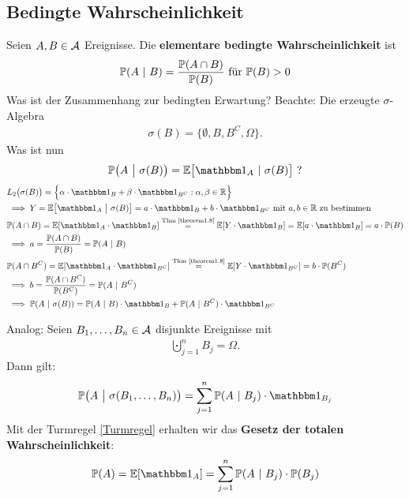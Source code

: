 \subsection*{Bedingte Wahrscheinlichkeit}
Seien $A,B\in\A$ Ereignisse. Die \textbf{elementare bedingte Wahrscheinlichkeit} ist 
\begin{align*}
	\P(A~|~B)=\frac{\P(A\cap B)}{\P(B)}\text{ für }\P(B)>0
\end{align*}
Was ist der Zusammenhang zur bedingten Erwartung?\nl
Beachte: Die erzeugte $\sigma$-Algebra 
\begin{align*}
	\sigma(B)=\big\lbrace\emptyset,B,B^C,\Omega\big\rbrace.
\end{align*}
Was ist nun 
\begin{align*}
	\P\big(A~\big|~\sigma(B)\big)=\E\big[\indi_A~|~\sigma(B)\big]\text{ ?}
\end{align*}
\begin{align*}
	&L_2\big(\sigma(B)\big)=\Big\lbrace \alpha\cdot\indi_B+\beta\cdot\indi_{B^C}:\alpha,\beta\in\R\Big\rbrace\\
	&\implies
	Y=\E\big[\indi_A~\big|~\sigma(B)\big]=a\cdot\indi_B+b\cdot\indi_{B^C}\mit a,b\in\R\text{ zu bestimmen}\\
	&\P(A\cap B)=\E[\indi_A\cdot\indi_B]
	\stackeq{\text{Thm \ref{theorem1.8}}}
	\E[Y\cdot\indi_B]=\E[a\cdot\indi_B]=a\cdot\P(B)\\
	&\implies
	a=\frac{\P(A\cap B)}{\P(B)}=\P(A~|~B)\\
	&\P(A\cap B^C)=\E[\indi_A\cdot\indi_{B^C}]
	\stackeq{\text{Thm \ref{theorem1.8}}}
	\E[Y\cdot\indi_{B^C}]=b\cdot\P(B^C)\\
	&\implies
	b=\frac{\P(A\cap B^C)}{\P(B^C)}=\P(A~|~B^C)\\
	&\implies
	\P(A~|~\sigma(B))=\P(A~|~B)\cdot\indi_B+\P(A~|~B^C)\cdot\indi_{B^C}
\end{align*}

Analog: Seien $B_1,\ldots,B_n\in\A$ disjunkte Ereignisse mit
\begin{align*}
	\bigcupdot\limits_{j=1}^n B_j=\Omega.
\end{align*}
Dann gilt:
\begin{align*}
	\P\big(A~\big|~\sigma(B_1,\ldots,B_n)\big)=\sum\limits_{j=1}^n\P(A~|~B_j)\cdot\indi_{B_j}
\end{align*}
Mit der Turmregel \eqref{Turmregel} erhalten wir das \textbf{Gesetz der totalen Wahrscheinlichkeit}:
\begin{align*}
	\P(A)=\E[\indi_A]=\sum\limits_{j=1}^n \P(A~|~B_j)\cdot\P(B_j)
\end{align*}

